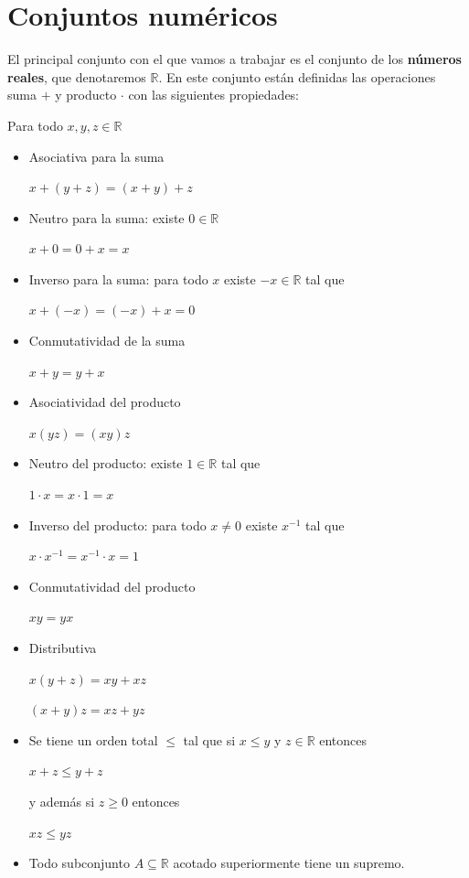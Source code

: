 \section{Conjuntos numéricos}

\begin{definition} \label{numeros_reales} 
El principal conjunto con el que vamos a trabajar es el conjunto de los \textbf{números reales}, que denotaremos $\mathbb{R}$.  En este conjunto están definidas las operaciones suma $+$ y producto $\cdot$ con las siguientes propiedades:

Para todo $x,y,z \in \mathbb{R}$

\begin{itemize}

\item Asociativa para la suma

$x+(y+z) = (x+y)+z$

\item Neutro para la suma: existe $0 \in \mathbb{R}$

$x+0 = 0+x = x$

\item Inverso para la suma: para todo $x$ existe $-x \in \mathbb{R}$ tal que

$x + (-x) = (-x) + x = 0$

\item Conmutatividad de la suma

$x+y = y+x$

\item Asociatividad del producto

$x(yz) = (xy)z$

\item Neutro del producto: existe $1 \in \mathbb{R}$ tal que

$1 \cdot x = x \cdot 1 = x$

\item Inverso del producto: para todo $x \neq 0$ existe $x^{-1}$ tal que

$x \cdot x^{-1} = x^{-1} \cdot x = 1$

\item Conmutatividad del producto

$xy = yx$

\item Distributiva

$x(y+z) = xy + xz$

$(x+y)z = xz + yz$

\item Se tiene un orden total $\leq$ tal que si $x \leq y$ y $z \in \mathbb{R}$ entonces

$x+z \leq y+z$

y además si $z \geq 0$ entonces

$xz \leq yz$ 

\item Todo subconjunto $A \subseteq \mathbb{R}$ acotado superiormente tiene un supremo.

\end{itemize}
\end{definition}

